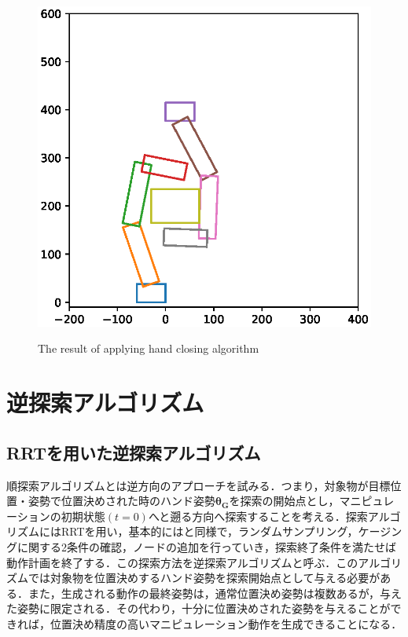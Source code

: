 \documentclass[a4paper,twoside,12pt,papersize, dvipdfmx]{iirthesis}
\begin{document}
\begin{figure}[b]
\begin{minipage}{0.49\hsize}
\includegraphics[width=0.9\hsize]{fig/3-new-planner/FC_rightleft.eps}
\label{fig::planner::afterfcrl}
\end{minipage}
\caption{The result of applying hand closing algorithm}\label{fig::planner::fc}
\end{figure}

\section{逆探索アルゴリズム}\label{sec::planner::reverse}
\subsection{RRTを用いた逆探索アルゴリズム}
順探索アルゴリズムとは逆方向のアプローチを試みる．つまり，対象物が目標位置・姿勢で位置決めされた時のハンド姿勢$\bm{\theta_G}$を探索の開始点とし，マニピュレーションの初期状態$(t=0)$へと遡る方向へ探索することを考える．探索アルゴリズムにはRRTを用い，基本的にはと同様で，ランダムサンプリング，ケージングに関する2条件の確認，ノードの追加を行っていき，探索終了条件を満たせば動作計画を終了する．この探索方法を逆探索アルゴリズムと呼ぶ．このアルゴリズムでは対象物を位置決めするハンド姿勢を探索開始点として与える必要がある．また，生成される動作の最終姿勢は，通常位置決め姿勢は複数あるが，与えた姿勢に限定される．その代わり，十分に位置決めされた姿勢を与えることができれば，位置決め精度の高いマニピュレーション動作を生成できることになる．
\end{document}
